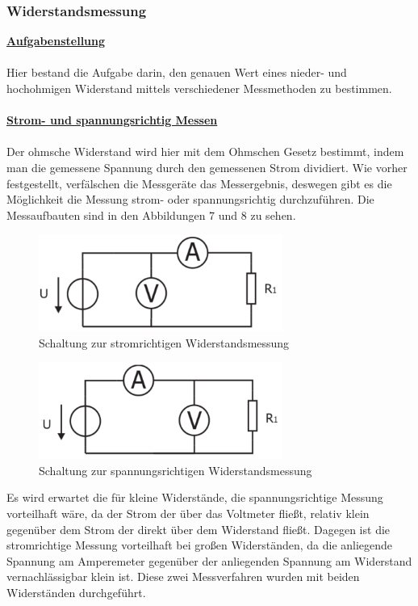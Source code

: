 \documentclass[a4paper,12pt]{article}
\begin{document}
	\subsubsection{Widerstandsmessung}
	\underline{\textbf{Aufgabenstellung}} \\ \\
	Hier bestand die Aufgabe darin, den genauen Wert eines nieder- und hochohmigen Widerstand mittels verschiedener Messmethoden zu bestimmen. \\ \\
	\underline{\textbf{Strom- und spannungsrichtig Messen}} \\ \\
	Der ohmsche Widerstand wird hier mit dem Ohmschen Gesetz bestimmt, indem man die gemessene Spannung durch den gemessenen Strom dividiert. Wie vorher festgestellt, verfälschen die Messgeräte das Messergebnis, deswegen gibt es die Möglichkeit die Messung strom- oder spannungsrichtig durchzuführen. Die Messaufbauten sind in den Abbildungen 7 und 8 zu sehen.
	\begin{figure}[h]
		\centering
		\includegraphics[width=8cm]{img/Stromrichtig}
		\caption{Schaltung zur stromrichtigen Widerstandsmessung}
	\end{figure}
	\begin{figure}[h]
		\centering
		\includegraphics[width=8cm]{img/Spannungsrichtig}
		\caption{Schaltung zur spannungsrichtigen Widerstandsmessung}
	\end{figure}
	\newpage
	\noindent
	Es wird erwartet die für kleine Widerstände, die spannungsrichtige Messung vorteilhaft wäre, da der Strom der über das Voltmeter fließt, relativ klein gegenüber dem Strom der direkt über dem Widerstand fließt. Dagegen ist die stromrichtige Messung vorteilhaft bei großen Widerständen, da die anliegende Spannung am Amperemeter gegenüber der anliegenden Spannung am Widerstand vernachlässigbar klein ist. Diese zwei Messverfahren wurden mit beiden Widerständen durchgeführt.
\end{document}
